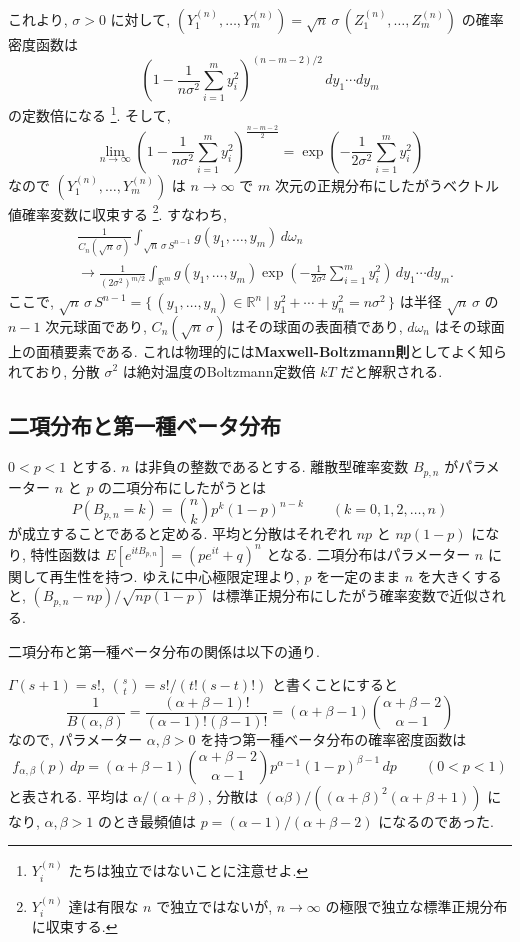 \documentclass[12pt,twoside]{jarticle}
\newcommand\R{{\mathbb R}} %
\theoremstyle{jplain}
\theoremstyle{jplain}
\theoremstyle{jplain}
\numberwithin{theorem}{section}
\numberwithin{equation}{section}
\numberwithin{figure}{section}
\numberwithin{table}{section}
\begin{document}
これより, $\sigma>0$ に対して, \(
 (Y^{(n)}_1,\ldots,Y^{(n)}_m)
 =\sqrt{n}\,\sigma\,(Z^{(n)}_1,\ldots,Z^{(n)}_m)
\) の確率密度函数は
\[
\left(1-\frac{1}{n\sigma^2}\sum_{i=1}^m y_i^2 \right)^{(n-m-2)/2}\,dy_1\cdots dy_m
\]
の定数倍になる%
\footnote{$Y^{(n)}_i$ たちは独立ではないことに注意せよ.}. そして,
\[
\lim_{n\to\infty}
\left(1-\frac{1}{n\sigma^2}\sum_{i=1}^m y_i^2 \right)^{\frac{n-m-2}{2}}
=\exp\left( -\frac{1}{2\sigma^2} \sum_{i=1}^m y_i^2 \right)
\]
なので $(Y^{(n)}_1,\ldots,Y^{(n)}_m)$ は $n\to\infty$ で
$m$ 次元の正規分布にしたがうベクトル値確率変数に収束する%
\footnote{$Y^{(n)}_i$ 達は有限な $n$ で独立ではないが, 
$n\to\infty$ の極限で独立な標準正規分布に収束する.}.
すなわち, 
\begin{align*}
&
\frac{1}{C_n(\sqrt{n}\,\sigma)}
\int_{\sqrt{n}\,\sigma\,S^{n-1}} g(y_1,\ldots,y_m) \,d\omega_n
\\ &
\longrightarrow
\frac{1}{(2\sigma^2)^{m/2}}
\int_{\R^m} g(y_1,\ldots,y_m)
\exp\left( -\frac{1}{2\sigma^2}\sum_{i=1}^my_i^2 \right)\,dy_1\cdots dy_m.
\end{align*}
ここで, \(
 \sqrt{n}\,\sigma\,S^{n-1}
 =\{\,(y_1,\ldots,y_n)\in\R^n\mid y_1^2+\cdots+y_n^2=n\sigma^2 \,\}
\) は半径 $\sqrt{n}\,\sigma$ の $n-1$ 次元球面であり, 
$C_n(\sqrt{n}\,\sigma)$ はその球面の表面積であり, 
$d\omega_n$ はその球面上の面積要素である.
これは物理的には{\bf Maxwell-Boltzmann則}としてよく知られており, 
分散 $\sigma^2$ は絶対温度のBoltzmann定数倍 $kT$ だと解釈される.


\subsection{二項分布と第一種ベータ分布}
\label{sec:Bin-Beta}

$0<p<1$ とする. 
$n$ は非負の整数であるとする.
離散型確率変数 $B_{p,n}$ がパラメーター $n$ と $p$ の二項分布にしたがうとは
\[
P(B_{p,n}=k) = \binom{n}{k}p^k(1-p)^{n-k}
\qquad (k=0,1,2,\ldots,n)
\]
が成立することであると定める.  平均と分散はそれぞれ $np$ と $np(1-p)$ になり, 
特性函数は $E[e^{itB_{p,n}}]=(pe^{it}+q)^n$ となる.  
二項分布はパラメーター $n$ に関して再生性を持つ.
ゆえに中心極限定理より, $p$ を一定のまま $n$ を大きくすると, 
$(B_{p,n}-np)/\sqrt{np(1-p)}$ は標準正規分布にしたがう確率変数で近似される.

二項分布と第一種ベータ分布の関係は以下の通り.

$\Gamma(s+1)=s!$, $\binom{s}{t}=s!/(t!(s-t)!)$ と書くことにすると
\[
\frac{1}{B(\alpha,\beta)}
=\frac{(\alpha+\beta-1)!}{(\alpha-1)!(\beta-1)!}
=(\alpha+\beta-1)\binom{\alpha+\beta-2}{\alpha-1}
\]
なので, パラメーター $\alpha,\beta>0$ を持つ第一種ベータ分布の確率密度函数は 
\[
f_{\alpha,\beta}(p)\,dp
=(\alpha+\beta-1)\binom{\alpha+\beta-2}{\alpha-1} p^{\alpha-1}(1-p)^{\beta-1}\,dp
\qquad (0<p<1)
\]
と表される. 
平均は $\alpha/(\alpha+\beta)$, 
分散は $(\alpha\beta)/((\alpha+\beta)^2(\alpha+\beta+1))$ になり, 
$\alpha,\beta>1$ のとき最頻値は $p=(\alpha-1)/(\alpha+\beta-2)$ になるのであった.
\end{document}
